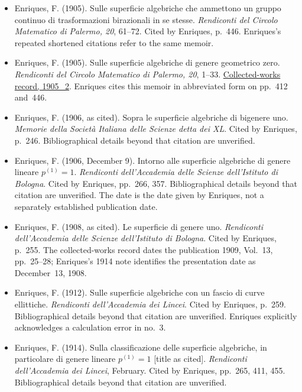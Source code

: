 \begin{sloppypar}
\begin{itemize}
\item Enriques, F. (1905). Sulle superficie algebriche che ammettono un gruppo continuo di trasformazioni birazionali in se stesse. \emph{Rendiconti del Circolo Matematico di Palermo, 20}, 61--72. Cited by Enriques, p.~446. Enriques's repeated shortened citations refer to the same memoir.

\item Enriques, F. (1905). Sulle superficie algebriche di genere geometrico zero. \emph{Rendiconti del Circolo Matematico di Palermo, 20}, 1--33. \href{https://www.federigoenriques.org/indice-cronologico-delle-opere/}{Collected-works record, 1905\_2}. Enriques cites this memoir in abbreviated form on pp.~412 and~446.

\item Enriques, F. (1906, as cited). Sopra le superficie algebriche di bigenere uno. \emph{Memorie della Società Italiana delle Scienze detta dei XL}. Cited by Enriques, p.~246. Bibliographical details beyond that citation are unverified.

\item Enriques, F. (1906, December 9). Intorno alle superficie algebriche di genere lineare $p^{(1)}=1$. \emph{Rendiconti dell'Accademia delle Scienze dell'Istituto di Bologna}. Cited by Enriques, pp.~266, 357. Bibliographical details beyond that citation are unverified. The date is the date given by Enriques, not a separately established publication date.

\item Enriques, F. (1908, as cited). Le superficie di genere uno. \emph{Rendiconti dell'Accademia delle Scienze dell'Istituto di Bologna}. Cited by Enriques, p.~255. The collected-works record dates the publication 1909, Vol.~13, pp.~25--28; Enriques's 1914 note identifies the presentation date as December~13, 1908.

\item Enriques, F. (1912). Sulle superficie algebriche con un fascio di curve ellittiche. \emph{Rendiconti dell'Accademia dei Lincei}. Cited by Enriques, p.~259. Bibliographical details beyond that citation are unverified. Enriques explicitly acknowledges a calculation error in no.~3.

\item Enriques, F. (1914). Sulla classificazione delle superficie algebriche, in particolare di genere lineare $p^{(1)}=1$ [title as cited]. \emph{Rendiconti dell'Accademia dei Lincei}, February. Cited by Enriques, pp.~265, 411, 455. Bibliographical details beyond that citation are unverified.


\end{itemize}
\end{sloppypar}
